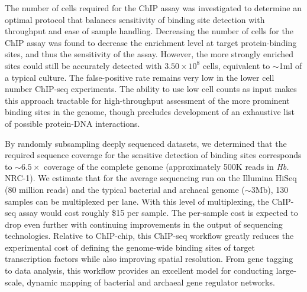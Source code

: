The number of cells required for the ChIP assay was investigated to determine an optimal protocol that balances sensitivity of binding site detection with throughput and ease of sample handling. Decreasing the number of cells for the ChIP assay was found to decrease the enrichment level at target protein-binding sites, and thus the sensitivity of the assay. However, the more strongly enriched sites could still be accurately detected with $3.50 \times 10^8$ cells, equivalent to $\sim$1ml of a typical culture. The false-positive rate remains very low in the lower cell number ChIP-seq experiments. The ability to use low cell counts as input makes this approach tractable for high-throughput assessment of the more prominent binding sites in the genome, though precludes development of an exhaustive list of possible protein-DNA interactions.

By randomly subsampling deeply sequenced datasets, we determined that the required sequence coverage for the sensitive detection of binding sites corresponds to $\sim 6.5\times$ coverage of the complete genome (approximately 500K reads in {\em Hb.} NRC-1). We estimate that for the average sequencing run on the Illumina HiSeq (80 million reads) and the typical bacterial and archaeal genome ($\sim$3Mb), 130 samples can be multiplexed per lane. With this level of multiplexing, the ChIP-seq assay would cost roughly \$15 per sample. The per-sample cost is expected to drop even further with continuing improvements in the output of sequencing technologies. Relative to ChIP-chip, this ChIP-seq workflow greatly reduces the experimental cost of defining the genome-wide binding sites of target transcription factors while also improving spatial resolution. From gene tagging to data analysis, this workflow provides an excellent model for conducting large-scale, dynamic mapping of bacterial and archaeal gene regulator networks.
